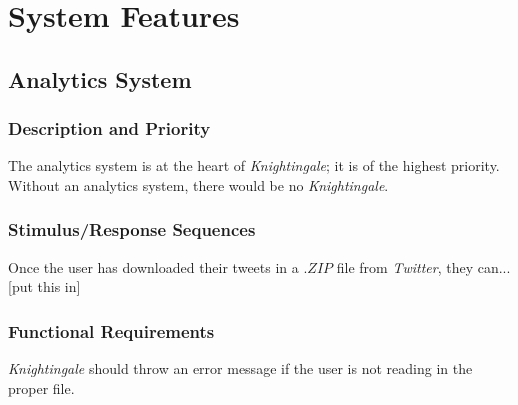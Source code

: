 \documentclass[a4paper, 12pt]{article}
\begin{document}
\section{System Features} \label{sec:sysfeat}
\subsection{Analytics System} \label{sec:analytics}
\subsubsection{Description and Priority} \label{description}
\begin{adjustwidth}{3em}{0pt}
The analytics system is at the heart of \textit{Knightingale}; it is of the highest priority. Without an analytics system, there would be no \textit{Knightingale}.
\end{adjustwidth}

\subsubsection{Stimulus/Response Sequences} \label{sec:stimulus}
\begin{adjustwidth}{3em}{0pt}
Once the user has downloaded their tweets in a $.ZIP$ file from \textit{Twitter}, they can...[put this in]
\end{adjustwidth}

\subsubsection{Functional Requirements} \label{sec:functional}
\begin{adjustwidth}{3em}{0pt}
\textit{Knightingale} should throw an error message if the user is not reading in the proper file.
\end{adjustwidth}
\end{document}
